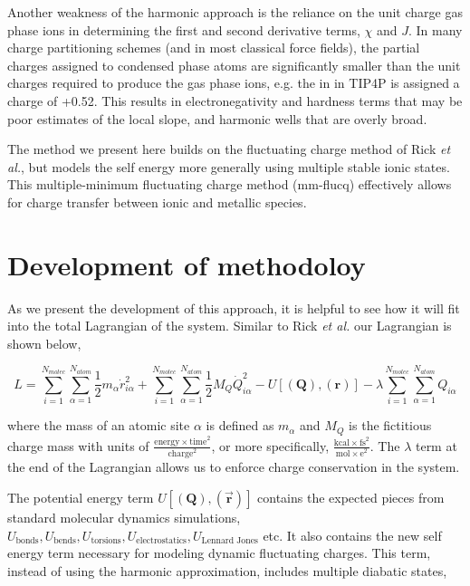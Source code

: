 Another weakness of the harmonic approach is the reliance on the unit charge
gas phase ions in determining the first and second derivative terms, $\chi$ and
$J$.  In many charge partitioning schemes (and in most classical force fields),
the partial charges assigned to condensed phase atoms are significantly smaller
than the unit charges required to produce the gas phase ions, e.g. the 
in  in TIP4P is assigned a charge of +0.52.\citep{Jorgensen:1983tp}
This results in electronegativity and hardness terms that may be poor estimates
of the local slope, and harmonic wells that are overly broad.

The method we present here builds on the fluctuating charge method of Rick {\it
et al.}\citep{Rick:1994ss}, but models the self energy more generally using
multiple stable ionic states.  This multiple-minimum fluctuating charge method
(mm-flucq) effectively allows for charge transfer between ionic and metallic
species.

\section{Development of methodoloy}

As we present the development of this approach, it is helpful to see how it
will fit into the total Lagrangian of the system. Similar to Rick {\it et
al.}\citep{Rick:1994ss} our Lagrangian is shown below,

\begin{equation}
L = \sum^{N_{molec}}_{i=1}\sum^{N_{atom}}_{\alpha = 1} \frac{1}{2}m_{\alpha} \dot{r}^2_{i\alpha} + \sum^{N_{molec}}_{i=1}\sum^{N_{atom}}_{\alpha = 1} \frac{1}{2}M_Q\dot{Q}^2_{i\alpha} - U[(\mathbf{Q}),(\mathbf{r})] - \lambda \sum^{N_{molec}}_{i=1}\sum^{N_{atom}}_{\alpha = 1} Q_{i\alpha}
\end{equation}

where the mass of an atomic site $\alpha$ is defined as $m_\alpha$ and $M_Q$ is
the fictitious charge mass with units of $\frac{\mathrm{energy\times
time}^2}{\mathrm{charge}^2}$, or more specifically, $\frac{\mathrm{kcal\times
fs}^2}{\mathrm{mol\times e}^2}$. The $\lambda$ term at the end of the
Lagrangian allows us to enforce charge conservation in the system.

The potential energy term $U[(\mathbf{Q}),(\vec{\mathbf{r}})]$ contains the
expected pieces from standard molecular dynamics simulations,
$U_{\text{bonds}}, U_{\text{bends}}, U_{\text{torsions}},
U_{\text{electrostatics}}, U_{\text{Lennard Jones}}$ etc. It also contains the
new self energy term necessary for modeling dynamic fluctuating charges. This
term, instead of using the harmonic approximation, includes multiple diabatic
states,

